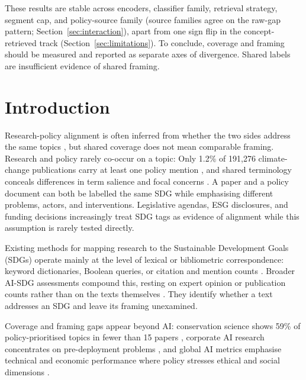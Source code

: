 \documentclass[12pt,a4paper]{article}
\renewenvironment{abstract}{%
  \par\addvspace{\baselineskip}%
  \noindent\textbf{\abstractname}\par\medskip
  \setlength{\parindent}{0pt}%
  \setlength{\leftskip}{0pt}%
  \setlength{\rightskip}{0pt}%
  \noindent\ignorespaces
}{%
  \par\addvspace{\baselineskip}%
}
\let\OldSection\section
\renewcommand{\section}{\clearpage\FloatBarrier\OldSection}
\begin{document}
\begin{abstract}
 These results are stable across encoders, classifier family, retrieval strategy, segment cap, and policy-source family (source families agree on the raw-gap pattern; Section~\ref{sec:interaction}), apart from one sign flip in the concept-retrieved track (Section~\ref{sec:limitations}). To conclude, coverage and framing should be measured and reported as separate axes of divergence. Shared labels are insufficient evidence of shared framing.
\end{abstract}

\clearpage
\tableofcontents
\clearpage
\listoffigures
\clearpage
\listoftables
\clearpage

\clearpage
{}
\section{Introduction}
\label{sec:intro}

Research-policy alignment is often inferred from whether the two sides address the same topics \parencite{bornmann2016policy}, but shared coverage does not mean comparable framing. Research and policy rarely co-occur on a topic: Only 1.2\% of 191,276 climate-change publications carry at least one policy mention \parencite{bornmann2016policy}, and shared terminology conceals differences in term salience and focal concerns \parencite{ToneyWails2024}. A paper and a policy document can both be labelled the same SDG while emphasising different problems, actors, and interventions. Legislative agendas, ESG disclosures, and funding decisions increasingly treat SDG tags as evidence of alignment \parencite{Heilinger2023, HerasSaizarbitoria2022} while this assumption is rarely tested directly.

Existing methods for mapping research to the Sustainable Development Goals (SDGs) operate mainly at the level of lexical or bibliometric correspondence: keyword dictionaries, Boolean queries, or citation and mention counts \parencite{Armitage2020, Kashnitsky2024}. Broader AI-SDG assessments compound this, resting on expert opinion or publication counts rather than on the texts themselves \parencite{Vinuesa2020}. They identify whether a text addresses an SDG and leave its framing unexamined.

Coverage and framing gaps appear beyond AI: conservation science shows 59\% of policy-prioritised topics in fewer than 15 papers \parencite{McCarthy2026}, corporate AI research concentrates on pre-deployment problems \parencite{Strauss2025}, and global AI metrics emphasise technical and economic performance where policy stresses ethical and social dimensions \parencite{SioumalasChristodoulou2025}.
\end{document}
